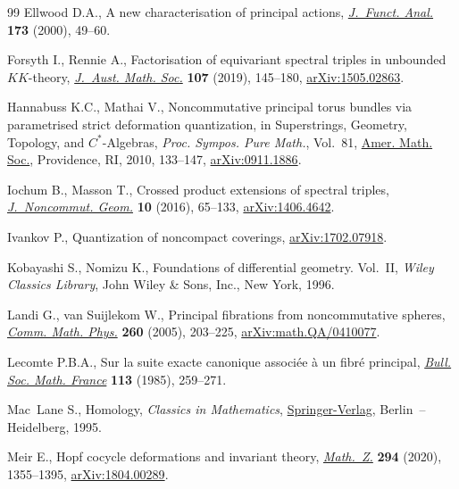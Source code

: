 \documentclass[pdftex]{sigma}
\numberwithin{equation}{section}
\begin{document}
\begin{thebibliography}{99}
Ellwood D.A., A new characterisation of principal actions, \href{https://doi.org/10.1006/jfan.2000.3561}{\textit{J.~Funct.
 Anal.}} \textbf{173} (2000), 49--60.

Forsyth I., Rennie A., Factorisation of equivariant spectral triples in
 unbounded {$KK$}-theory, \href{https://doi.org/10.1017/s1446788718000423}{\textit{J.~Aust. Math. Soc.}} \textbf{107} (2019),
 145--180, \href{https://arxiv.org/abs/1505.02863}{arXiv:1505.02863}.

Hannabuss K.C., Mathai V., Noncommutative principal torus bundles via
 parametrised strict deformation quantization, in Superstrings, Geometry,
 Topology, and {$C^\ast$}-Algebras, \textit{Proc. Sympos. Pure Math.},
 Vol.~81, \href{https://doi.org/10.1090/pspum/081/2681761}{Amer. Math. Soc.}, Providence, RI, 2010, 133--147,
 \href{https://arxiv.org/abs/0911.1886}{arXiv:0911.1886}.

Iochum B., Masson T., Crossed product extensions of spectral triples,
 \href{https://doi.org/10.4171/JNCG/229}{\textit{J.~Noncommut. Geom.}} \textbf{10} (2016), 65--133, \href{https://arxiv.org/abs/1406.4642}{arXiv:1406.4642}.

Ivankov P., Quantization of noncompact coverings, \href{https://arxiv.org/abs/1702.07918}{arXiv:1702.07918}.

Kobayashi S., Nomizu K., Foundations of differential geometry. {V}ol.~{II},
 \textit{Wiley Classics Library}, John Wiley \& Sons, Inc., New York, 1996.

Landi G., van Suijlekom W., Principal fibrations from noncommutative spheres,
 \href{https://doi.org/10.1007/s00220-005-1377-7}{\textit{Comm. Math. Phys.}} \textbf{260} (2005), 203--225,
 \href{https://arxiv.org/abs/math.QA/0410077}{arXiv:math.QA/0410077}.

Lecomte P.B.A., Sur la suite exacte canonique associ\'ee \`a un fibr\'e
 principal, \href{https://doi.org/10.24033/bsmf.2032}{\textit{Bull. Soc. Math. France}} \textbf{113} (1985), 259--271.

Mac~Lane S., Homology, \textit{Classics in Mathematics}, \href{https://doi.org/10.1007/978-3-642-62029-4}{Springer-Verlag}, Berlin~--
 Heidelberg, 1995.

Meir E., Hopf cocycle deformations and invariant theory, \href{https://doi.org/10.1007/s00209-019-02326-5}{\textit{Math.~Z.}}
 \textbf{294} (2020), 1355--1395, \href{https://arxiv.org/abs/1804.00289}{arXiv:1804.00289}.


\end{thebibliography}
\end{document}
